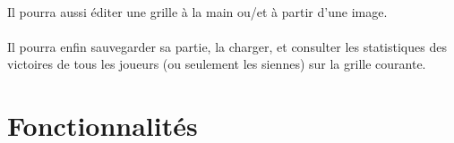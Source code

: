         \paragraph*{}
        Il pourra aussi éditer une grille à la main ou/et à partir d'une image.
        \paragraph*{}
        Il pourra enfin sauvegarder sa partie, la charger, et consulter les statistiques des victoires de tous les joueurs (ou seulement les siennes) sur la grille courante.




\section{Fonctionnalités}
